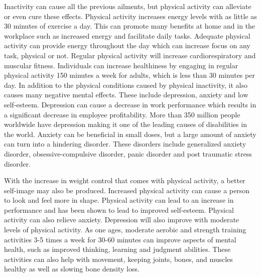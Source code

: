 \documentclass[12pt,journal]{IEEEtran}
\begin{document}
		Inactivity can cause all the previous ailments, but physical activity can alleviate or even cure these effects. Physical activity increases energy 
		levels with as little as 30 minutes of exercise a day. \cite{16} This can promote many benefits at home and in the workplace such as increased 
		energy and facilitate daily tasks. Adequate physical activity can provide energy throughout the day which can increase focus on any task, physical 
		or not. \cite{17} Regular physical activity will increase cardiorespiratory and muscular fitness. \cite{3} Individuals can increase healthiness by 
		engaging in regular physical activity 150 minutes a week for adults, which is less than 30 minutes per day. \cite{18}
		In addition to the physical conditions caused by physical inactivity, it also causes many negative mental effects. These include depression, anxiety 
		and low self-esteem. Depression can cause a decrease in work performance which results in a significant decrease in employee profitability. \cite{11} 
		More than 350 million people worldwide have depression making it one of the leading causes of disabilities in the world. \cite{12} Anxiety can be beneficial 
		in small doses, but a large amount of anxiety can turn into a hindering disorder. These disorders include generalized anxiety disorder, obsessive-compulsive 
		disorder, panic disorder and post traumatic stress disorder. \cite{13}  
		
		With the increase in weight control that comes with physical activity, a better self-image may also be produced. Increased physical activity can cause a person 
		to look and feel more in shape. Physical activity can lead to an increase in performance and has been shown to lead to improved self-esteem. Physical activity 
		can also relieve anxiety. \cite{13} Depression will also improve with moderate levels of physical activity. \cite{17}
		As one ages, moderate aerobic and strength training activities 3-5 times a week for 30-60 minutes can improve aspects of mental health, such as improved thinking, 
		learning and judgment abilities. These activities can also help with movement, keeping joints, bones, and muscles healthy as well as slowing bone density loss. \cite{18}
\end{document}
